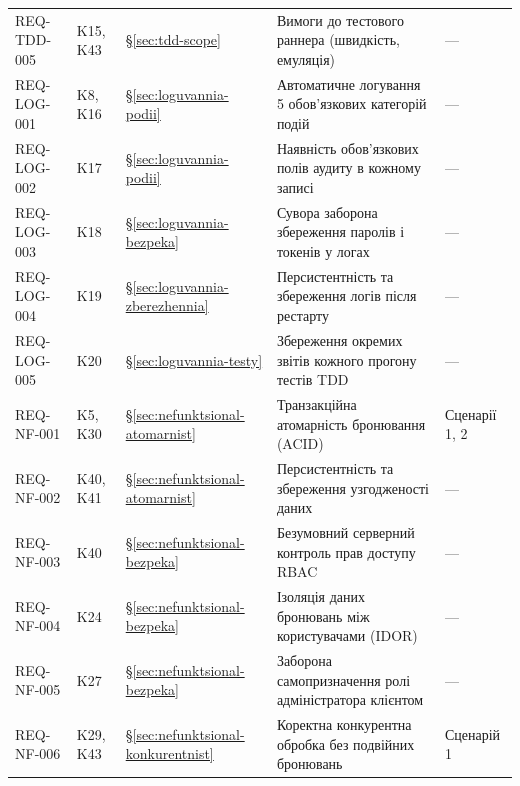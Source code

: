 \begin{small}
\begin{longtable}{@{}p{2.2cm} p{1.4cm} p{1.6cm} p{7.4cm} p{2.4cm}@{}}
REQ-TDD-005 & K15, K43 & \S\ref{sec:tdd-scope} & Вимоги до тестового раннера (швидкість, емуляція) & --- \\
REQ-LOG-001 & K8, K16 & \S\ref{sec:loguvannia-podii} & Автоматичне логування 5 обов'язкових категорій подій & --- \\
REQ-LOG-002 & K17 & \S\ref{sec:loguvannia-podii} & Наявність обов'язкових полів аудиту в кожному записі & --- \\
REQ-LOG-003 & K18 & \S\ref{sec:loguvannia-bezpeka} & Сувора заборона збереження паролів і токенів у логах & --- \\
REQ-LOG-004 & K19 & \S\ref{sec:loguvannia-zberezhennia} & Персистентність та збереження логів після рестарту & --- \\
REQ-LOG-005 & K20 & \S\ref{sec:loguvannia-testy} & Збереження окремих звітів кожного прогону тестів TDD & --- \\
REQ-NF-001 & K5, K30 & \S\ref{sec:nefunktsional-atomarnist} & Транзакційна атомарність бронювання (ACID) & Сценарії 1, 2 \\
REQ-NF-002 & K40, K41 & \S\ref{sec:nefunktsional-atomarnist} & Персистентність та збереження узгодженості даних & --- \\
REQ-NF-003 & K40 & \S\ref{sec:nefunktsional-bezpeka} & Безумовний серверний контроль прав доступу RBAC & --- \\
REQ-NF-004 & K24 & \S\ref{sec:nefunktsional-bezpeka} & Ізоляція даних бронювань між користувачами (IDOR) & --- \\
REQ-NF-005 & K27 & \S\ref{sec:nefunktsional-bezpeka} & Заборона самопризначення ролі адміністратора клієнтом & --- \\
REQ-NF-006 & K29, K43 & \S\ref{sec:nefunktsional-konkurentnist} & Коректна конкурентна обробка без подвійних бронювань & Сценарій 1 \\
\bottomrule
\end{longtable}
\end{small}
